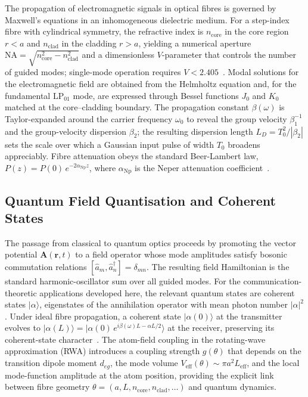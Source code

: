 \documentclass[journal,twocolumn]{IEEEtran}
\theoremstyle{definition}
\theoremstyle{plain}
\begin{document}
The propagation of electromagnetic signals in optical fibres is
governed by Maxwell's equations in an inhomogeneous dielectric
medium.  For a step-index fibre with cylindrical symmetry, the
refractive index is $n_{\mathrm{core}}$ in the core region $r < a$
and $n_{\mathrm{clad}}$ in the cladding $r > a$, yielding a
numerical aperture $\mathrm{NA}=\sqrt{n_{\mathrm{core}}^2 -
n_{\mathrm{clad}}^2}$ and a dimensionless $V$-parameter that
controls the number of guided modes; single-mode operation requires
$V < 2.405$~\cite{snyder1983}.  Modal solutions for the
electromagnetic field are obtained from the Helmholtz equation and,
for the fundamental $\mathrm{LP}_{01}$ mode, are expressed through
Bessel functions $J_0$ and $K_0$ matched at the core--cladding
boundary.  The propagation constant $\beta(\omega)$ is Taylor-expanded
around the carrier frequency $\omega_0$ to reveal the group velocity
$\beta_1^{-1}$ and the group-velocity dispersion $\beta_2$; the
resulting dispersion length $L_D = T_0^2/|\beta_2|$ sets the scale
over which a Gaussian input pulse of width $T_0$ broadens
appreciably.  Fibre attenuation obeys the standard Beer-Lambert law,
$P(z) = P(0)\,e^{-2\alpha_{\mathrm{Np}}z}$, where $\alpha_{\mathrm{Np}}$
is the Neper attenuation coefficient~\cite{agrawal2007}.

\subsection{Quantum Field Quantisation and Coherent States}

The passage from classical to quantum optics proceeds by promoting
the vector potential $\mathbf{A}(\mathbf{r},t)$ to a field operator
whose mode amplitudes satisfy bosonic commutation relations
$[\hat{a}_m, \hat{a}_n^\dagger] = \delta_{mn}$.  The resulting
field Hamiltonian is the standard harmonic-oscillator sum over all
guided modes.  For the communication-theoretic applications developed
here, the relevant quantum states are coherent states
$|\alpha\rangle$, eigenstates of the annihilation operator with mean
photon number $|\alpha|^2$.  Under ideal fibre propagation, a coherent
state $|\alpha(0)\rangle$ at the transmitter evolves to
$|\alpha(L)\rangle = |\alpha(0)\,e^{i\beta(\omega)L - \alpha L/2}\rangle$
at the receiver, preserving its coherent-state character~\cite{loudon2000,kok2010}.
The atom-field coupling in the rotating-wave approximation (RWA)
introduces a coupling strength $g(\theta)$ that depends on the
transition dipole moment $d_{eg}$, the mode volume
$V_{\mathrm{eff}}(\theta) \sim \pi a^2 L_{\mathrm{eff}}$, and
the local mode-function amplitude at the atom position, providing
the explicit link between fibre geometry $\theta = (a, L, n_{\mathrm{core}},
n_{\mathrm{clad}}, \ldots)$ and quantum dynamics.
\end{document}
